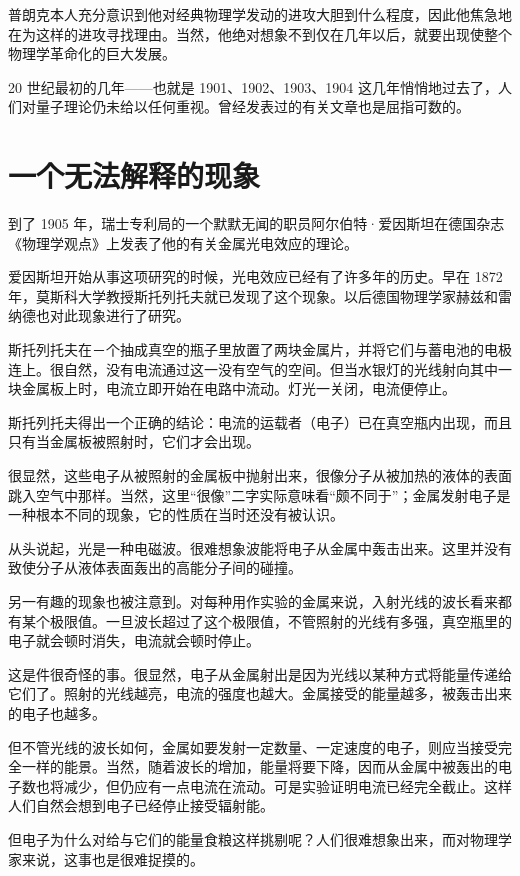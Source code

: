 普朗克本人充分意识到他对经典物理学发动的进攻大胆到什么程度，因此他焦急地在为这样的进攻寻找理由。当然，他绝对想象不到仅在几年以后，就要出现使整个物理学革命化的巨大发展。

20 世纪最初的几年——也就是 1901、1902、1903、1904 这几年悄悄地过去了，人们对量子理论仍未给以任何重视。曾经发表过的有关文章也是屈指可数的。

\section{一个无法解释的现象}

到了 1905 年，瑞士专利局的一个默默无闻的职员阿尔伯特·爱因斯坦在德国杂志《物理学观点》上发表了他的有关金属光电效应的理论。

爱因斯坦开始从事这项研究的时候，光电效应已经有了许多年的历史。早在 1872 年，莫斯科大学教授斯托列托夫就已发现了这个现象。以后德国物理学家赫兹和雷纳德也对此现象进行了研究。

斯托列托夫在－个抽成真空的瓶子里放置了两块金属片，并将它们与蓄电池的电极连上。很自然，没有电流通过这一没有空气的空间。但当水银灯的光线射向其中一块金属板上时，电流立即开始在电路中流动。灯光一关闭，电流便停止。

斯托列托夫得出一个正确的结论：电流的运载者（电子）已在真空瓶内出现，而且只有当金属板被照射时，它们才会出现。

很显然，这些电子从被照射的金属板中抛射出来，很像分子从被加热的液体的表面跳入空气中那样。当然，这里“很像”二字实际意味看“颇不同于”；金属发射电子是一种根本不同的现象，它的性质在当时还没有被认识。

从头说起，光是一种电磁波。很难想象波能将电子从金属中轰击出来。这里并没有致使分子从液体表面轰出的高能分子间的碰撞。

另一有趣的现象也被注意到。对每种用作实验的金属来说，入射光线的波长看来都有某个极限值。一旦波长超过了这个极限值，不管照射的光线有多强，真空瓶里的电子就会顿时消失，电流就会顿时停止。

这是件很奇怪的事。很显然，电子从金属射出是因为光线以某种方式将能量传递给它们了。照射的光线越亮，电流的强度也越大。金属接受的能量越多，被轰击出来的电子也越多。

但不管光线的波长如何，金属如要发射一定数量、一定速度的电子，则应当接受完全一样的能景。当然，随着波长的增加，能量将要下降，因而从金属中被轰出的电子数也将减少，但仍应有一点电流在流动。可是实验证明电流已经完全截止。这样人们自然会想到电子已经停止接受辐射能。

但电子为什么对给与它们的能量食粮这样挑剔呢？人们很难想象出来，而对物理学家来说，这事也是很难捉摸的。

